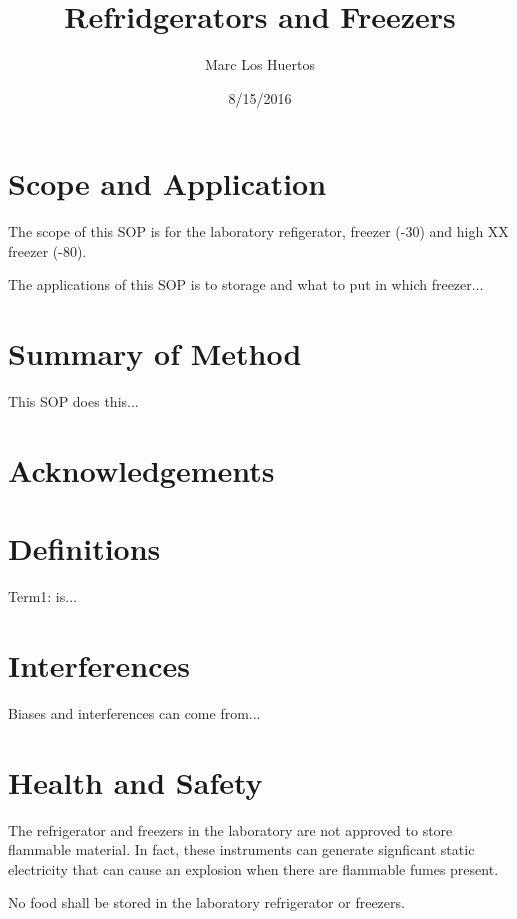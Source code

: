\documentclass[12pt]{../SOP3_alpha}
\title{Refridgerators and Freezers}
\date{8/15/2016}
\author{Marc Los Huertos}
\begin{document}


\maketitle

\section{Scope and Application}

\NP The scope of this SOP is for the laboratory refigerator, freezer (-30) and high XX freezer (-80).

\NP The applications of this SOP is to storage and what to put in which freezer...

\section{Summary of Method}

\NP This SOP does this...

\tableofcontents

\newpage

\section{Acknowledgements}

\section{Definitions}

\NP Term1: is...

\section{Interferences}

\NP Biases and interferences can come from...

\section{Health and Safety}

\NP The refrigerator and freezers in the laboratory are not approved to store flammable material. In fact, these instruments can generate signficant static electricity that can cause an explosion when there are flammable fumes present. 

\NP No food shall be stored in the laboratory refrigerator or freezers.
\end{document}
